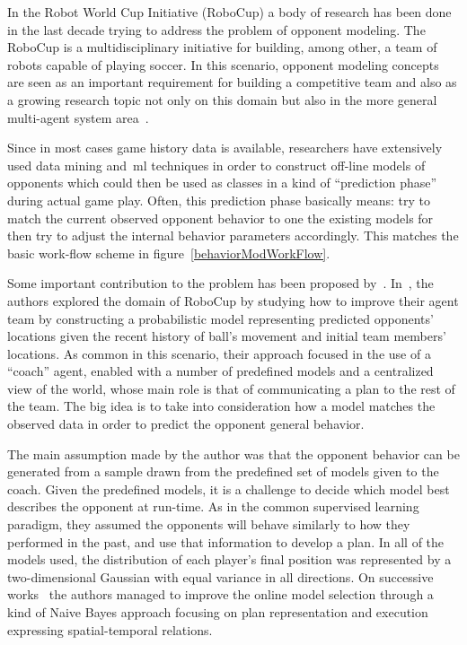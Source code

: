 In the Robot World Cup Initiative (RoboCup) a body of research has been done in the last decade trying to address the problem of opponent modeling. The RoboCup is a multidisciplinary initiative for building, among other, a team of robots capable of playing soccer. In this scenario, opponent modeling concepts are seen as an important requirement for building a competitive team and also as a growing research topic not only on this domain but also in the more general multi-agent system area~\citep{rofer_overview_2012}. 

Since in most cases game history data is available, researchers have extensively used data mining and~\gls{ml} techniques in order to construct off-line models of opponents which could then be used as classes in a kind of ``prediction phase'' during actual game play. Often, this prediction phase basically means: try to match the current observed opponent behavior to one the existing models for then try to adjust the internal behavior parameters accordingly. This matches the basic work-flow scheme in figure~\ref{behaviorModWorkFlow}.

Some important contribution to the problem has been proposed by~\citep{fix_behavior_2000,riley_recognizing_2002,riley_coaching_2001,riley_planning_2002}. In~\cite{riley_recognizing_2002}, the authors explored the domain of RoboCup by studying how to improve their agent team by constructing a probabilistic model representing predicted opponents' locations given the recent history of ball's movement and initial team members' locations. As common in this scenario, their approach focused in the use of a ``coach'' agent, enabled with a number of predefined models and a centralized view of the world, whose main role is that of communicating a plan to the rest of the team. The big idea is to take into consideration how a model matches the observed data in order to predict the opponent general behavior. 

The main assumption made by the author was that the opponent behavior can be generated from a sample drawn from the predefined set of models given to the coach. Given the predefined models, it is a challenge to decide which model best describes the opponent at run-time. As in the common supervised learning paradigm, they assumed the opponents will behave similarly to how they performed in the past, and use that information to develop a plan. In all of the models used, the distribution of each player's final position was represented by a two-dimensional Gaussian with equal variance in all directions. On successive works~\citep{riley_coaching_2001,riley_planning_2002} the authors managed to improve the online model selection through a kind of Naive Bayes approach focusing on plan representation and execution expressing spatial-temporal relations. 

